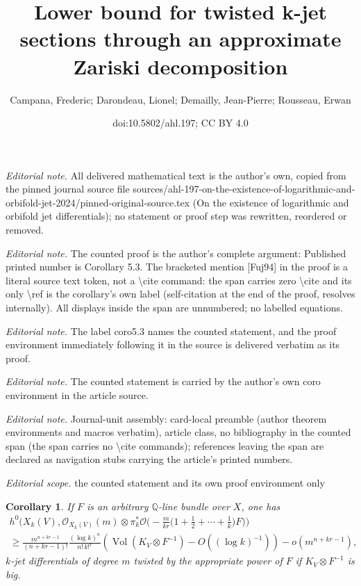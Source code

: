 \documentclass[10pt,a4paper]{article}
\title{Lower bound for twisted k-jet sections through an approximate Zariski decomposition}
\author{Campana, Frederic; Darondeau, Lionel; Demailly, Jean-Pierre; Rousseau, Erwan}
\date{doi:10.5802/ahl.197; CC BY 4.0}
\DeclareMathOperator{\Vol}{Vol}
\newcommand*\cO{\mathcal{O}}
\newcommand*\bQ{\mathbb{Q}}
\let\geq\geqslant
\newtheorem{coro}[cdrthm]{Corollary}
\numberwithin{equation}{section}
\begin{document}
\maketitle
\setcounter{section}{5}
\setcounter{cdrthm}{2}
\noindent\textit{Editorial note.} All delivered mathematical text is the author's own, copied from the pinned journal source file sources/ahl-197-on-the-existence-of-logarithmic-and-orbifold-jet-2024/pinned-original-source.tex (On the existence of logarithmic and orbifold jet differentials); no statement or proof step was rewritten, reordered or removed.\par\medskip
\noindent\textit{Editorial note.} The counted proof is the author's complete argument: Published printed number is Corollary 5.3. The bracketed mention [Fuj94] in the proof is a literal source text token, not a \textbackslash{}cite command: the span carries zero \textbackslash{}cite and its only \textbackslash{}ref is the corollary's own label (self-citation at the end of the proof, resolves internally). All displays inside the span are unnumbered; no labelled equations.\par\medskip
\noindent\textit{Editorial note.} The label coro5.3 names the counted statement, and the proof environment immediately following it in the source is delivered verbatim as its proof.\par\medskip
\noindent\textit{Editorial note.} The counted statement is carried by the author's own coro environment in the article source.\par\medskip
\noindent\textit{Editorial note.} Journal-unit assembly: card-local preamble (author theorem environments and macros verbatim), article class, no bibliography in the counted span (the span carries no \textbackslash{}cite commands); references leaving the span are declared as navigation stubs carrying the article's printed numbers.\par\medskip
\noindent\textit{Editorial scope.} the counted statement and its own proof environment only\par\medskip
\begin{coro}\label{coro5.3}
If $F$ is an arbitrary $\bQ$-line bundle over $X$, one has
\begin{multline*}
h^0\bigg(X_k(V),\cO_{X_k(V)}(m)\otimes\pi_k^*\cO
\Big(-\tfrac{m}{ kr}\Big(1+\tfrac{1}{ 2}+\cdots+\tfrac{1}{ k}\Big)F\Big)\bigg)
\\
\geq \tfrac{m^{n+kr-1}}{(n+kr-1)!}
\tfrac{(\log k)^n}{ n!\,k!^r}\left(
\Vol(K_V\otimes F^{-1})-O\left((\log k)^{-1}\right)\right)-o\left(m^{n+kr-1}\right),
\end{multline*}
$k$-jet differentials of degree $m$ twisted by the appropriate power of $F$ if $K_V\otimes F^{-1}$ is big.
\end{coro}
\end{document}
